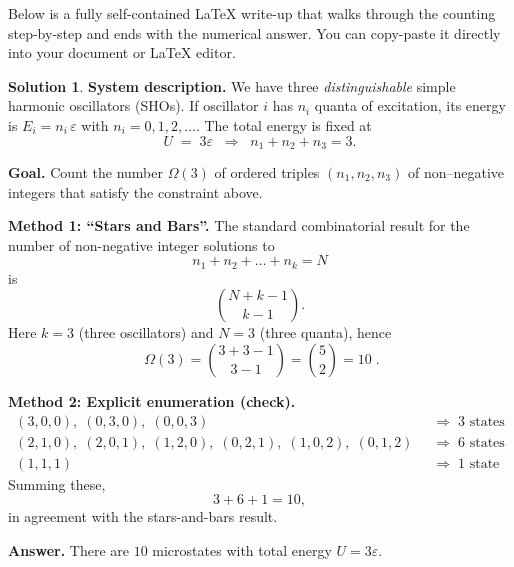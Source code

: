 \documentclass[12pt]{article}
\title{}
\author{Jerich Lee}
\date{\today}
\theoremstyle{definition} %
\newtheorem{solution}{Solution}
\theoremstyle{plain} %
\begin{document}
\maketitle
Below is a fully self-contained LaTeX write-up that walks through the counting step-by-step and ends with the numerical answer.
You can copy-paste it directly into your document or LaTeX editor.

\begin{solution}
\textbf{System description.}  
We have three \emph{distinguishable} simple harmonic oscillators (SHOs).  
If oscillator $i$ has $n_i$ quanta of excitation, its energy is $E_i = n_i\,\varepsilon$ with
\(n_i = 0,1,2,\dots\).  
The total energy is fixed at
\[
U \;=\; 3\varepsilon
      \;\;\Longrightarrow\;\;
      n_1 + n_2 + n_3 = 3.
\]

\medskip
\textbf{Goal.}  
Count the number $\Omega(3)$ of ordered triples $(n_1,n_2,n_3)$ of
non–negative integers that satisfy the constraint above.

\medskip
\textbf{Method 1: “Stars and Bars”.}  
The standard combinatorial result for the number of non-negative integer
solutions to
\[
n_1 + n_2 + \dots + n_k = N
\]
is
\[
\binom{N+k-1}{k-1}.
\]
Here $k=3$ (three oscillators) and $N=3$ (three quanta), hence
\[
\boxed{\;
\Omega(3)
  = \binom{3+3-1}{3-1}
  = \binom{5}{2}
  = 10
\; }.
\]

\medskip
\textbf{Method 2: Explicit enumeration (check).}
\[
\begin{aligned}
(3,0,0),\;(0,3,0),\;(0,0,3) &\;\;\Rightarrow\; 3 \text{ states} \\[4pt]
(2,1,0),\;(2,0,1),\;(1,2,0),\;(0,2,1),\;(1,0,2),\;(0,1,2)
 &\;\;\Rightarrow\; 6 \text{ states} \\[4pt]
(1,1,1) &\;\;\Rightarrow\; 1 \text{ state}
\end{aligned}
\]
Summing these,
\[
3 + 6 + 1 = 10,
\]
in agreement with the stars-and-bars result.

\medskip
\textbf{Answer.}\quad
There are \(\boxed{10}\) microstates with total energy \(U = 3\varepsilon\).
\end{solution}
\end{document}
